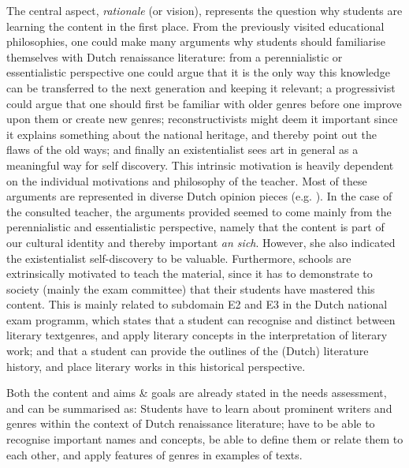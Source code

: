 The central aspect, \emph{rationale} (or vision), represents the question why students are learning the content in the first place. From the previously visited educational philosophies, one could make many arguments why students should familiarise themselves with Dutch renaissance literature: from a perennialistic or essentialistic perspective one could argue that it is the only way this knowledge can be transferred to the next generation and keeping it relevant; a progressivist could argue that one should first be familiar with older genres before one improve upon them or create new genres; reconstructivists might deem it important since it explains something about the national heritage, and thereby point out the flaws of the old ways; and finally an existentialist sees art in general as a meaningful way for self discovery. This intrinsic motivation is heavily dependent on the individual motivations and philosophy of the teacher. Most of these arguments are represented in diverse Dutch opinion pieces (e.g. ). In the case of the consulted teacher, the arguments provided seemed to come mainly from the perennialistic and essentialistic perspective, namely that the content is part of our cultural identity and thereby important \emph{an sich}. However, she also indicated the existentialist self-discovery to be valuable. Furthermore, schools are extrinsically motivated to teach the material, since it has to demonstrate to society (mainly the exam committee) that their students have mastered this content. This is mainly related to subdomain E2 and E3 in the Dutch national exam programm, which states that a student can recognise and distinct between literary textgenres, and apply literary concepts in the interpretation of literary work; and that a student can provide the outlines of the (Dutch) literature history, and place literary works in this historical perspective.

Both the content and aims \& goals are already stated in the needs assessment, and can be summarised as: Students have to learn about prominent writers and genres within the context of Dutch renaissance literature; have to be able to recognise important names and concepts, be able to define them or relate them to each other, and apply features of genres in examples of texts.

